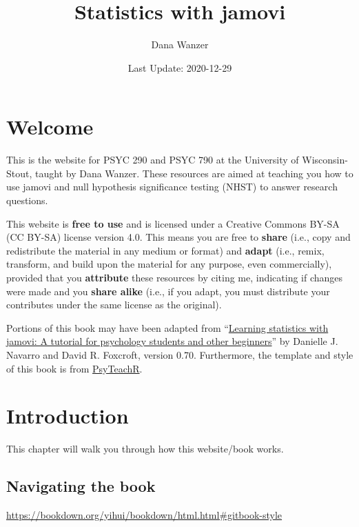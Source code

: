 \documentclass[
]{book}
\title{Statistics with jamovi}
\author{Dana Wanzer}
\date{Last Update: 2020-12-29}
\begin{document}
\maketitle

{
\setcounter{tocdepth}{1}
\tableofcontents
}
\hypertarget{welcome}{%
\chapter*{Welcome}\label{welcome}}

This is the website for PSYC 290 and PSYC 790 at the University of Wisconsin-Stout, taught by Dana Wanzer. These resources are aimed at teaching you how to use jamovi and null hypothesis significance testing (NHST) to answer research questions.

This website is \textbf{free to use} and is licensed under a Creative Commons BY-SA (CC BY-SA) license version 4.0. This means you are free to \textbf{share} (i.e., copy and redistribute the material in any medium or format) and \textbf{adapt} (i.e., remix, transform, and build upon the material for any purpose, even commercially), provided that you \textbf{attribute} these resources by citing me, indicating if changes were made and you \textbf{share alike} (i.e., if you adapt, you must distribute your contributes under the same license as the original).

Portions of this book may have been adapted from ``\href{http://www.learnstatswithjamovi.com}{Learning statistics with jamovi: A tutorial for psychology students and other beginners}'' by Danielle J. Navarro and David R. Foxcroft, version 0.70. Furthermore, the template and style of this book is from \href{https://psyteachr.github.io/book-template/setup.html}{PsyTeachR}.

\hypertarget{introduction}{%
\chapter{Introduction}\label{introduction}}

This chapter will walk you through how this website/book works.

\hypertarget{navigating-the-book}{%
\section{Navigating the book}\label{navigating-the-book}}

\url{https://bookdown.org/yihui/bookdown/html.html\#gitbook-style}
\end{document}
